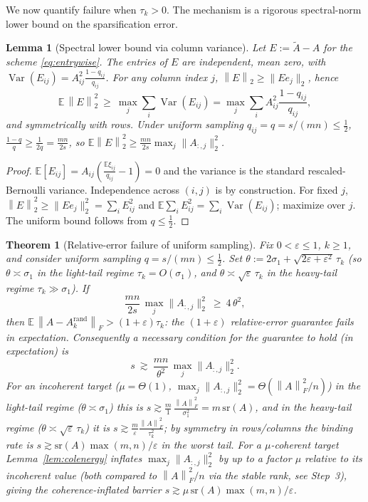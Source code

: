 \documentclass{amsart}
\newtheorem{theorem}{Theorem}
\newtheorem{lemma}{Lemma}
\theoremstyle{definition}
\DeclareMathOperator{\Var}{Var}
\newcommand{\Frob}[1]{\left\lVert #1\right\rVert_F}
\newcommand{\Op}[1]{\left\lVert #1\right\rVert_2}
\newcommand{\Atil}{\widetilde{A}}
\newcommand{\E}{\mathbb{E}}
\begin{document}
We now quantify failure when $\tau_k>0$. The mechanism is a rigorous
spectral-norm lower bound on the sparsification error.

\begin{lemma}[Spectral lower bound via column variance]\label{lem:colvar}
Let $E:=\Atil-A$ for the scheme \eqref{eq:entrywise}. The entries of $E$ are
independent, mean zero, with $\Var(E_{ij})=A_{ij}^2\frac{1-q_{ij}}{q_{ij}}$.
For any column index $j$, $\Op E\ge\|E e_j\|_2$, hence
\begin{equation}\label{eq:colvar}
\E\,\Op E^2\ \ge\ \max_j\sum_i\Var(E_{ij})
=\max_j\sum_i A_{ij}^2\frac{1-q_{ij}}{q_{ij}},
\end{equation}
and symmetrically with rows. Under uniform sampling $q_{ij}=q=s/(mn)\le\tfrac12$,
$\frac{1-q}{q}\ge\frac{1}{2q}=\frac{mn}{2s}$, so
$\E\Op E^2\ge\frac{mn}{2s}\max_j\|A_{:,j}\|_2^2$.
\end{lemma}

\begin{proof}
$\E[E_{ij}]=A_{ij}(\frac{\E\xi_{ij}}{q_{ij}}-1)=0$ and the variance is the
standard rescaled-Bernoulli variance. Independence across $(i,j)$ is by
construction. For fixed $j$, $\Op E^2\ge\|Ee_j\|_2^2=\sum_iE_{ij}^2$ and
$\E\sum_iE_{ij}^2=\sum_i\Var(E_{ij})$; maximize over $j$. The uniform bound
follows from $q\le\tfrac12$.
\end{proof}

\begin{theorem}[Relative-error failure of uniform sampling]\label{thm:fail}
Fix $0<\varepsilon\le1$, $k\ge1$, and consider uniform sampling
$q=s/(mn)\le\tfrac12$. Set
$\theta:=2\sigma_1+\sqrt{2\varepsilon+\varepsilon^2}\,\tau_k$ (so
$\theta\asymp\sigma_1$ in the light-tail regime $\tau_k=O(\sigma_1)$, and
$\theta\asymp\sqrt\varepsilon\,\tau_k$ in the heavy-tail regime
$\tau_k\gg\sigma_1$). If
\begin{equation}\label{eq:failcond}
\frac{mn}{2s}\,\max_j\|A_{:,j}\|_2^2\ \ge\ 4\,\theta^2 ,
\end{equation}
then $\E\,\Frob{A-A_k^{\mathrm{rand}}}>(1+\varepsilon)\tau_k$: the
$(1+\varepsilon)$ relative-error guarantee fails in expectation. Consequently a
necessary condition for the guarantee to hold (in expectation) is
\begin{equation}\label{eq:barrier}
s\ \gtrsim\ \frac{mn}{\theta^2}\,\max_j\|A_{:,j}\|_2^2 .
\end{equation}
For an incoherent target ($\mu=\Theta(1)$, $\max_j\|A_{:,j}\|_2^2
=\Theta(\Frob A^2/n)$) in the light-tail regime ($\theta\asymp\sigma_1$) this is
$s\gtrsim\frac{m}{1}\,\frac{\Frob A^2}{\sigma_1^2}=m\,\mathrm{sr}(A)$, and in the
heavy-tail regime ($\theta\asymp\sqrt\varepsilon\,\tau_k$) it is
$s\gtrsim\frac{m}{\varepsilon}\frac{\Frob A^2}{\tau_k^2}$; by symmetry in
rows/columns the binding rate is $s\gtrsim\mathrm{sr}(A)\max(m,n)/\varepsilon$ in
the worst tail. For a $\mu$-coherent target Lemma~\ref{lem:colenergy} inflates
$\max_j\|A_{:,j}\|_2^2$ by up to a factor $\mu$ relative to its incoherent value
(both compared to $\Frob A^2/n$ via the stable rank, see Step~3), giving the
coherence-inflated barrier
$s\gtrsim\mu\,\mathrm{sr}(A)\max(m,n)/\varepsilon$.
\end{theorem}
\end{document}
